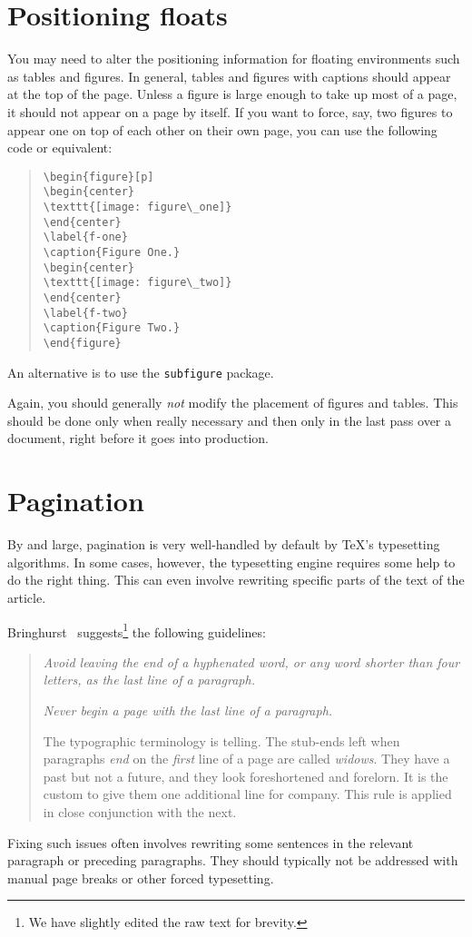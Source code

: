 \documentclass[openany]{now} %
\begin{document}
\section{Positioning floats}

You may need to alter the positioning information for floating
environments such as tables and figures. In general, tables and figures with
captions should appear at the top of the page. Unless a figure is large enough
to take up most of a page, it should not appear on a page by itself. If you
want to force, say, two figures to appear one on top of each other on
their own page, you can use the following code or equivalent:
\begin{quote}
\begin{verbatim}
\begin{figure}[p]
\begin{center}
\texttt{[image: figure\_one]}
\end{center}
\label{f-one}
\caption{Figure One.}
\begin{center}
\texttt{[image: figure\_two]}
\end{center}
\label{f-two}
\caption{Figure Two.}
\end{figure}
\end{verbatim}
\end{quote}
An alternative is to use the \texttt{subfigure} package.

Again, you should generally \emph{not} modify the placement of
figures and tables. This should be done only when really necessary 
and then only in the last pass over a document, right before it goes
into production.

\section{Pagination}

By and large, pagination is very well-handled by default by
\TeX's typesetting algorithms. In some cases, however, the typesetting
engine requires some help to do the right thing. This can even involve
rewriting specific parts of the text of the article. 

Bringhurst~\citep[\S2.4]{Bri:12} suggests\footnote{We have slightly
edited the raw text for brevity.} the following guidelines:
\begin{quote}
    \emph{Avoid leaving the end of a hyphenated word, or any
    word shorter than four letters, as the last line of a paragraph.}

    \emph{Never begin a page with the last line of a paragraph.}

    The typographic terminology is telling. The stub-ends left when paragraphs
    \emph{end} on the \emph{first} line of a page are called \emph{widows}.
    They have a past but not a future, and they look foreshortened and
    forelorn.  It is the custom to give them one additional line for company.
    This rule is applied in close conjunction with the next.  
\end{quote}
Fixing such issues often involves rewriting some sentences in the relevant
paragraph or preceding paragraphs. They should typically not be addressed
with manual page breaks or other forced typesetting.
\end{document}
